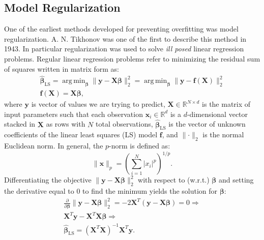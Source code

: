 \documentclass[a4paper, twoside, nobib]{tufte-book}
\newcommand{\abs}[1]{\lvert#1\rvert}
\newcommand{\norm}[1]{\lVert#1\rVert}
\renewcommand{\vec}[1]{\mathbf{#1}}
\DeclareMathOperator*{\argmin}{arg\,min} %
\begin{document}
\subsection{Model Regularization}
\label{subsec:regularization}
One of the earliest methods developed for preventing overfitting was model regularization. A. N. Tikhonov \citep{tikhonovStabilityInverseProblems1943} was one of the first to describe this method in 1943. In particular regularization was used to solve \emph{ill posed} linear regression problems. Regular linear regression problems refer to minimizing the residual sum of squares written in matrix form as:
\begin{equation}
  \begin{split}
    \hat{\bm{\beta}}_{\mathrm{LS}} = \argmin_{\bm{\beta}} \norm{\vec{y} - \vec{X} \bm{\beta} }_2^2 = \argmin_{\bm{\beta}} \norm{ \vec{y} - \vec{f}(\vec{X}) }_2^2 \\
    \vec{f}(\vec{X}) = \vec{X} \bm{\beta},
  \end{split}
\end{equation}
where $\vec{y}$ is vector of values we are trying to predict, $\vec{X}\in\mathbb{R}^{N\times d}$ is the matrix of input parameters such that each observation $\vec{x}_i \in \mathbb{R}^d$ is a $d$-dimensional vector stacked in $\vec{X}$ as rows with $N$ total observations, $\hat{\bm{\beta}}_{\mathrm{LS}}$ is the vector of unknown coefficients of the linear least squares (LS) model $\vec{f}$, and $\norm{ \bm{\cdot} }_2$ is the normal Euclidean norm. In general, the $p$-norm is defined as:
\begin{equation}
  \norm{\vec{x}}_p = \left( \sum_{i=1}^N \abs{x_i}^p \right)^{1/p}.
\end{equation}
Differentiating the objective $\norm{\vec{y} - \vec{X} \bm{\beta} }_2^2$ with respect to (w.r.t.) $\bm{\beta}$ and setting the derivative equal to $0$ to find the minimum  yields the solution for $\bm{\beta}$:
\begin{equation}
  \begin{split}
    \frac{\partial}{\partial \bm{\beta}} \norm{\vec{y} - \vec{X} \bm{\beta} }_2^2 = -2 \vec{X}^T \left( \vec{y} - \vec{X} \bm{\beta} \right) = 0  \Rightarrow \\
    \vec{X}^T \vec{y} - \vec{X}^T \vec{X} \bm{\beta} \Rightarrow \\
    \hat{\bm{\beta}}_{\mathrm{LS}} =  \left( \vec{X}^T \vec{X} \right)^{-1} \vec{X}^T \vec{y}.
  \end{split}
\end{equation}
\end{document}
